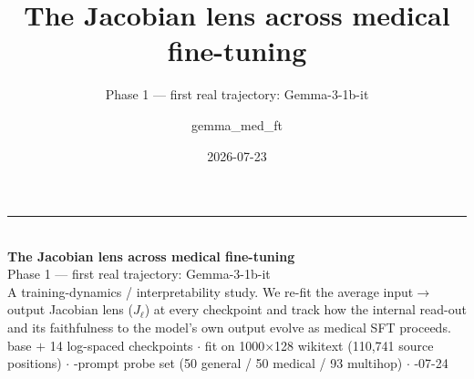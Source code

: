 \documentclass[aspectratio=169,11pt]{beamer}
\title{\bfseries The Jacobian lens across medical fine-tuning}
\subtitle{Phase 1 --- first real trajectory: Gemma-3-1b-it}
\author{gemma\_med\_ft}
\date{2026-07-23}
\begin{document}
{
\begin{frame}
  \vspace{1.2em}
  {\color{genblue}\rule{\textwidth}{2pt}}\\[0.8em]
  {\LARGE\bfseries The Jacobian lens across medical fine-tuning}\\[0.5em]
  {\large Phase 1 --- first real trajectory: Gemma-3-1b-it}\\[1.2em]
  {\color{muted}\small A training-dynamics / interpretability study.
   We re-fit the average input$\rightarrow$output Jacobian lens ($J_\ell$) at every
   checkpoint and track how the internal read-out and its faithfulness to the
   model's own output evolve as medical SFT proceeds.}\\[1em]
  {\color{muted}\footnotesize base $+$ 14 log-spaced checkpoints \; $\cdot$ \;
   fit on 1000$\times$128 wikitext (110{,}741 source positions) \; $\cdot$ -prompt probe set (50 general / 50 medical / 93 multihop) \; $\cdot$ -07-24}
\end{frame}}
\end{document}
